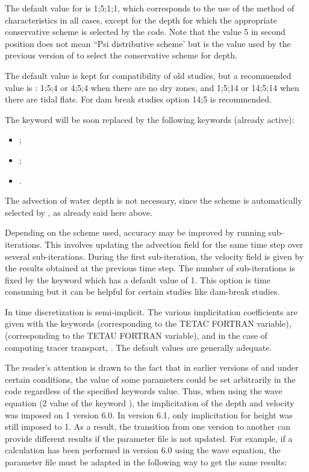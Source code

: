  The default value for  is 1;5;1;1, which corresponds to the use of the method of characteristics in all cases, except for the depth for which the appropriate conservative scheme is selected by the code. Note that the value 5 in second position does not mean ``Psi distributive scheme' but is the value used by the previous version of  to select the conservative scheme for depth.

 The default value is kept for compatibility of old studies, but a recommended value is : 1;5;4 or 4;5;4 when there are no dry zones, and 1;5;14 or 14;5;14 when there are tidal flats. For dam break studies option 14;5 is recommended.

The keyword  will be soon replaced by the following keywords (already active):
\begin{itemize}
\item {};
\item {};
\item {}.
\end{itemize}
The advection of water depth is not necessary, since the scheme is automatically selected by , as already said here above.

 Depending on the scheme used, accuracy may be improved by running sub-iterations. This involves updating the advection field for the same time step over several sub-iterations. During the first sub-iteration, the velocity field is given by the results obtained at the previous time step. The number of sub-iterations is fixed by the keyword  which has a default value of 1. This option is time consuming but it can be helpful for certain studies like dam-break studies.

 In  time discretization is semi-implicit. The various implicitation coefficients are given with the keywords (corresponding to the TETAC FORTRAN variable),  (corresponding to the TETAU FORTRAN variable),  and in the case of computing tracer transport, . The default values are generally adequate.

 The reader's attention is drawn to the fact that in earlier versions of  and under certain conditions, the value of some parameters could be set arbitrarily in the code regardless of the specified keywords value. Thus, when using the wave equation (2 value of the keyword ), the implicitation of the depth and velocity was imposed on 1 version 6.0. In version 6.1, only implicitation for height was still imposed to 1. As a result, the transition from one version to another can provide different results if the parameter file is not updated. For example, if a calculation has been performed in version 6.0 using the wave equation, the parameter file must be adapted in the following way to get the same results:

